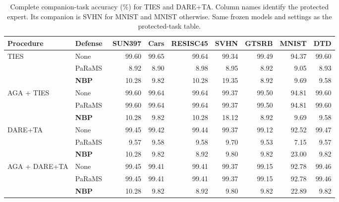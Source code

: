 \begin{table}[!t]
\centering
\small
\setlength{\tabcolsep}{4pt}
\caption{Complete companion-task accuracy (\%) for TIES and DARE+TA. Column names identify the protected expert. Its companion is SVHN for MNIST and MNIST otherwise. Same frozen models and settings as the protected-task table.}
\label{tab:fusion-companions}
\begin{tabular}{llrrrrrrr}
\toprule
Procedure & Defense & SUN397 & Cars & RESISC45 & SVHN & GTSRB & MNIST & DTD \\
\midrule
\multirow{3}{*}{TIES} & None & 99.60 & 99.65 & 99.64 & 99.34 & 99.49 & 94.37 & 99.60 \\
 & PaRaMS~\cite{wei2025params} & 8.92 & 8.90 & 8.98 & 8.95 & 8.92 & 9.05 & 8.93 \\
 & \textbf{NBP} & 10.28 & 9.82 & 10.28 & 19.35 & 8.92 & 9.69 & 9.58 \\
\midrule
\multirow{3}{*}{AGA + TIES} & None & 99.60 & 99.64 & 99.64 & 99.37 & 99.50 & 94.81 & 99.60 \\
 & PaRaMS~\cite{wei2025params} & 99.60 & 99.64 & 99.64 & 99.37 & 99.50 & 94.81 & 99.60 \\
 & \textbf{NBP} & 10.28 & 9.82 & 10.28 & 18.12 & 8.92 & 9.69 & 9.58 \\
\midrule
\multirow{3}{*}{DARE+TA} & None & 99.45 & 99.42 & 99.44 & 99.37 & 99.12 & 92.52 & 99.47 \\
 & PaRaMS~\cite{wei2025params} & 9.57 & 9.58 & 9.58 & 9.70 & 9.53 & 7.15 & 9.57 \\
 & \textbf{NBP} & 10.28 & 9.82 & 8.92 & 9.80 & 9.82 & 23.00 & 9.82 \\
\midrule
\multirow{3}{*}{AGA + DARE+TA} & None & 99.45 & 99.41 & 99.41 & 99.37 & 99.15 & 92.78 & 99.46 \\
 & PaRaMS~\cite{wei2025params} & 99.45 & 99.41 & 99.41 & 99.37 & 99.15 & 92.78 & 99.46 \\
 & \textbf{NBP} & 10.28 & 9.82 & 8.92 & 9.80 & 9.82 & 22.89 & 9.82 \\
\bottomrule
\end{tabular}
\end{table}
